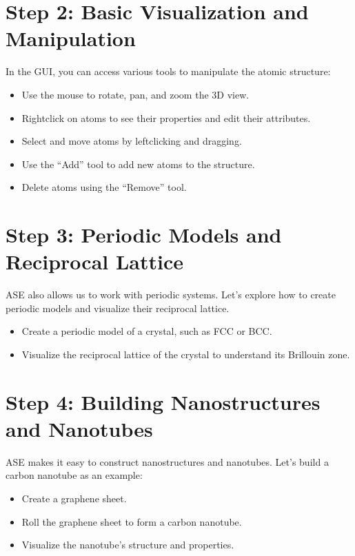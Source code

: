 \documentclass[letterpaper,10pt,english]{sphinxmanual}
\begin{document}
\section{Step 2: Basic Visualization and Manipulation}
\label{\detokenize{asebasics/asebasics:step-2-basic-visualization-and-manipulation}}
\sphinxAtStartPar
In the GUI, you can access various tools to manipulate the atomic structure:
\begin{itemize}
\item {} 
\sphinxAtStartPar
Use the mouse to rotate, pan, and zoom the 3D view.

\item {} 
\sphinxAtStartPar
Right\sphinxhyphen{}click on atoms to see their properties and edit their attributes.

\item {} 
\sphinxAtStartPar
Select and move atoms by left\sphinxhyphen{}clicking and dragging.

\item {} 
\sphinxAtStartPar
Use the “Add” tool to add new atoms to the structure.

\item {} 
\sphinxAtStartPar
Delete atoms using the “Remove” tool.

\end{itemize}


\section{Step 3: Periodic Models and Reciprocal Lattice}
\label{\detokenize{asebasics/asebasics:step-3-periodic-models-and-reciprocal-lattice}}
\sphinxAtStartPar
ASE also allows us to work with periodic systems. Let’s explore how to create periodic models and visualize their reciprocal lattice.
\begin{itemize}
\item {} 
\sphinxAtStartPar
Create a periodic model of a crystal, such as FCC or BCC.

\item {} 
\sphinxAtStartPar
Visualize the reciprocal lattice of the crystal to understand its Brillouin zone.

\end{itemize}


\section{Step 4: Building Nanostructures and Nanotubes}
\label{\detokenize{asebasics/asebasics:step-4-building-nanostructures-and-nanotubes}}
\sphinxAtStartPar
ASE makes it easy to construct nanostructures and nanotubes. Let’s build a carbon nanotube as an example:
\begin{itemize}
\item {} 
\sphinxAtStartPar
Create a graphene sheet.

\item {} 
\sphinxAtStartPar
Roll the graphene sheet to form a carbon nanotube.

\item {} 
\sphinxAtStartPar
Visualize the nanotube’s structure and properties.

\end{itemize}
\end{document}
